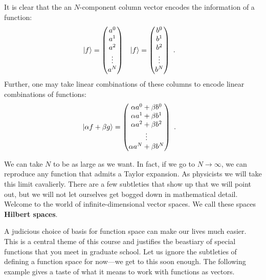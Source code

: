 \documentclass[12pt, oneside]{report}    %
\begin{document}
It is clear that the an $N$-component column vector encodes the information of a function:
\begin{align}
    \left|f\right\rangle &= 
    \begin{pmatrix}
        a^0 \\ a^1 \\ a^2 \\ \vdots \\ a^N
    \end{pmatrix} 
    &
\left|f\right\rangle &= 
    \begin{pmatrix}
        b^0 \\ b^1 \\ b^2 \\ \vdots \\ b^N
    \end{pmatrix} 
    \ .
\end{align}
Further, one may take linear combinations of these columns to encode linear combinations of functions:
\begin{align}
    \left|\alpha f + \beta g\right\rangle
    &= 
    \begin{pmatrix}
        \alpha a^0 + \beta b^0 \\ \alpha a^1 + \beta b^1 
        \\ \alpha a^2 + \beta b^2 \\ \vdots \\ 
        \alpha a^N + \beta b^N
    \end{pmatrix}  \ .
\end{align}

We can take $N$ to be as large as we want. In fact, if we go to $N\to \infty$, we can reproduce any function that admits a Taylor expansion. As physicists we will take this limit cavalierly. There are a few subtleties that show up that we will point out, but we will not let ourselves get bogged down in mathematical detail. Welcome to the world of infinite-dimensional vector spaces. We call these spaces \textbf{Hilbert spaces}.

A judicious choice of basis for function space can make our lives much easier. This is a central theme of this course and justifies the beastiary of special functions that you meet in graduate school. Let us ignore the subtleties of defining a function space for now---we get to this soon enough. The following example gives a taste of what it means to work with functions as vectors.
\end{document}
